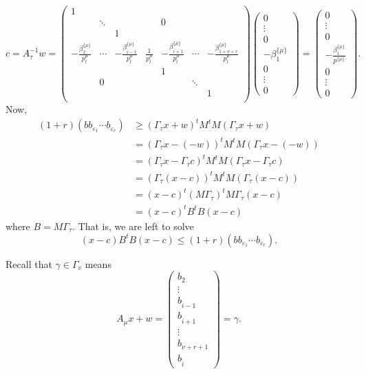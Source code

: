 \[c = A_{\tau}^{-1}w =  \begin{pmatrix}
1	& 		&		&		&		&		&	\\
	& \ddots	& 		&		& 0		& 		&	\\
	&		& 1		&		&		&		&	\\
	-\frac{\beta_2^{\{\mu\}}}{p_l^{\mu}} & \cdots & -\frac{\beta_{\hat{i} - 1}^{\{\mu\}}}{p_l^{\mu}} & \frac{1}{p_l^{\mu}} & -\frac{\beta_{\hat{i} + 1}^{\{\mu\}}}{p_l^{\mu}}& \cdots &-\frac{\beta_{1+ \nu+ r}^{\{\mu\}}}{p_l^{\mu}}\\
	& 		& 		& 		& 1		&		&	\\	
	& 0		& 		& 		&		& \ddots	&	\\	
	& 		& 		& 		&		& 		& 1	\\
	\end{pmatrix}\begin{pmatrix}
	0 \\ \vdots \\ 0 \\ -\beta_1^{\{\mu\}} \\ 0 \\ \vdots \\ 0
	\end{pmatrix}
	= \begin{pmatrix}
	0 \\ \vdots \\ 0 \\-\frac{\beta_1^{\{\mu\}}}{p^{\{\mu\}}} \\ 0 \\ \vdots \\ 0
\end{pmatrix}.\]
Now, 
\begin{align*}
(1 + r)(bb_{\varepsilon_1}\cdots b_{\varepsilon_r})
	& \geq (\Gamma_\tau x+w)^tM^tM(\Gamma_\tau x+w) \\
	& =  (\Gamma_\tau x- (-w))^tM^tM(\Gamma_\tau x-(-w)) \\
	& = (\Gamma_\tau x-\Gamma_{\tau}c)^tM^tM(\Gamma_\tau x-\Gamma_{\tau}c)\\
	& = (\Gamma_\tau (x-c))^tM^tM(\Gamma_\tau (x-c))\\
	& = (x-c)^t(M\Gamma_{\tau})^tM\Gamma_\tau(x-c)\\
	& = (x-c)^tB^tB(x-c)
\end{align*}
where $B = M\Gamma_\tau$. That is, we are left to solve
\[(x-c)B^tB(x-c) \leq (1 + r)(bb_{\varepsilon_1}\cdots b_{\varepsilon_r}).\]




Recall that $\gamma \in \Gamma_v$ means
\[A_{\mu}x + w = \begin{pmatrix}
b_2 \\ \vdots \\ b_{\hat{i} -1} \\ b_{\hat{i} +1} \\ \vdots \\ b_{\nu+r+1} \\ b_{\hat{i}}
\end{pmatrix} = \gamma.\]



\endinput

Any text after an \endinput is ignored.
You could put scraps here or things in progress.
